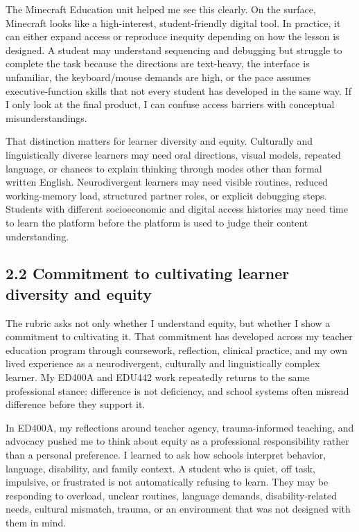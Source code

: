 \documentclass[12pt]{article}
\begin{document}
The Minecraft Education unit helped me see this clearly. On the surface, Minecraft looks like a high-interest, student-friendly digital tool. In practice, it can either expand access or reproduce inequity depending on how the lesson is designed. A student may understand sequencing and debugging but struggle to complete the task because the directions are text-heavy, the interface is unfamiliar, the keyboard/mouse demands are high, or the pace assumes executive-function skills that not every student has developed in the same way. If I only look at the final product, I can confuse access barriers with conceptual misunderstandings.

That distinction matters for learner diversity and equity. Culturally and linguistically diverse learners may need oral directions, visual models, repeated language, or chances to explain thinking through modes other than formal written English. Neurodivergent learners may need visible routines, reduced working-memory load, structured partner roles, or explicit debugging steps. Students with different socioeconomic and digital access histories may need time to learn the platform before the platform is used to judge their content understanding.

\subsection{2.2 Commitment to cultivating learner diversity and equity}

The rubric asks not only whether I understand equity, but whether I show a commitment to cultivating it. That commitment has developed across my teacher education program through coursework, reflection, clinical practice, and my own lived experience as a neurodivergent, culturally and linguistically complex learner. My ED400A and EDU442 work repeatedly returns to the same professional stance: difference is not deficiency, and school systems often misread difference before they support it.

In ED400A, my reflections around teacher agency, trauma-informed teaching, and advocacy pushed me to think about equity as a professional responsibility rather than a personal preference. I learned to ask how schools interpret behavior, language, disability, and family context. A student who is quiet, off task, impulsive, or frustrated is not automatically refusing to learn. They may be responding to overload, unclear routines, language demands, disability-related needs, cultural mismatch, trauma, or an environment that was not designed with them in mind.
\end{document}
